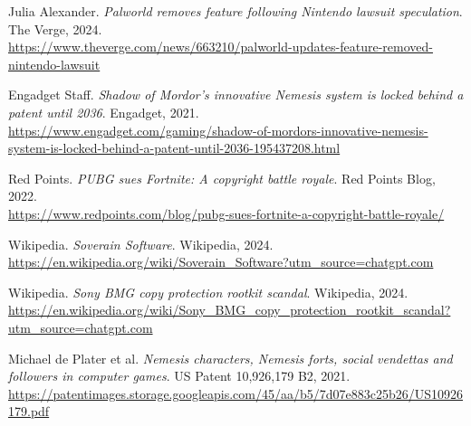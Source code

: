 \documentclass[12pt,letterpaper]{article}
\begin{document}
\begin{thebibliography}{99}

Julia Alexander. \textit{Palworld removes feature following Nintendo lawsuit speculation}. The Verge, 2024.\\
\url{https://www.theverge.com/news/663210/palworld-updates-feature-removed-nintendo-lawsuit}

Engadget Staff. \textit{Shadow of Mordor’s innovative Nemesis system is locked behind a patent until 2036}. Engadget, 2021.\\
\url{https://www.engadget.com/gaming/shadow-of-mordors-innovative-nemesis-system-is-locked-behind-a-patent-until-2036-195437208.html}

Red Points. \textit{PUBG sues Fortnite: A copyright battle royale}. Red Points Blog, 2022.\\
\url{https://www.redpoints.com/blog/pubg-sues-fortnite-a-copyright-battle-royale/}

Wikipedia. \textit{Soverain Software}. Wikipedia, 2024.\\
\url{https://en.wikipedia.org/wiki/Soverain_Software?utm_source=chatgpt.com}

Wikipedia. \textit{Sony BMG copy protection rootkit scandal}. Wikipedia, 2024.\\
\url{https://en.wikipedia.org/wiki/Sony_BMG_copy_protection_rootkit_scandal?utm_source=chatgpt.com}

Michael de Plater et al. \textit{Nemesis characters, Nemesis forts, social vendettas and followers in computer games}. US Patent 10,926,179 B2, 2021.\\
\url{https://patentimages.storage.googleapis.com/45/aa/b5/7d07e883c25b26/US10926179.pdf}

\end{thebibliography}
\end{document}
